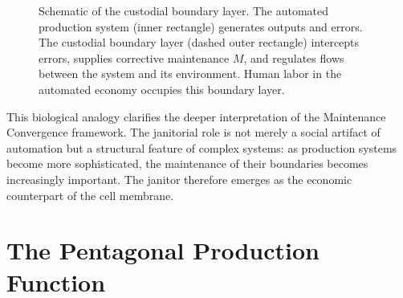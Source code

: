 \documentclass[12pt,a4paper]{article}
\theoremstyle{plain}
\theoremstyle{definition}
\theoremstyle{remark}
\begin{document}
\begin{figure}[h]
\centering
{}
\caption{Schematic of the custodial boundary layer. The automated production
system (inner rectangle) generates outputs and errors. The custodial boundary
layer (dashed outer rectangle) intercepts errors, supplies corrective
maintenance $M$, and regulates flows between the system and its environment.
Human labor in the automated economy occupies this boundary layer.}
\label{fig:boundary}
\end{figure}

This biological analogy clarifies the deeper interpretation of the Maintenance
Convergence framework.  The janitorial role is not merely a social artifact of
automation but a structural feature of complex systems: as production systems
become more sophisticated, the maintenance of their boundaries becomes
increasingly important.  The janitor therefore emerges as the economic
counterpart of the cell membrane.

\section{The Pentagonal Production Function}
\label{sec:pentagon}
\end{document}
